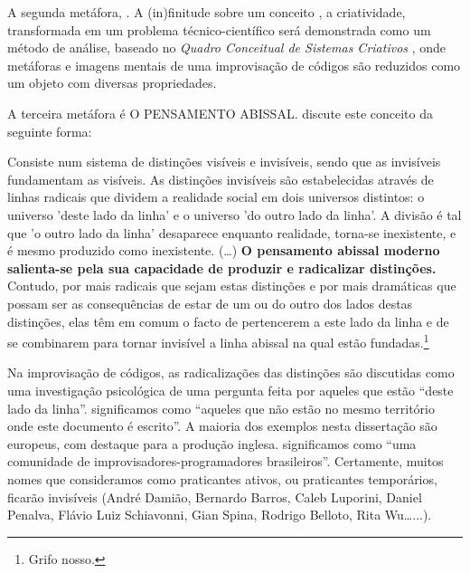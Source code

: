 A segunda metáfora,  \cite[p.~15]{santos_filosofia_2008}. A (in)finitude sobre um conceito , a criatividade, transformada em um problema técnico-científico será demonstrada como um método de análise, baseado no \emph{Quadro Conceitual de Sistemas Criativos} \cite{mclean_music_2006,Forth2010}, onde metáforas e imagens mentais de uma improvisação de códigos são reduzidos como um objeto com diversas propriedades. 

A terceira metáfora é \MakeTextUppercase{o pensamento abissal}.  discute este conceito da seguinte forma:

\begin{citacao}
Consiste num sistema de distinções visíveis e invisíveis, sendo que as invisíveis fundamentam as visíveis. As distinções invisíveis são estabelecidas através de linhas radicais que dividem a realidade social em dois universos distintos: o universo  'deste lado da linha' e o universo 'do outro lado da linha'. A divisão é tal que 'o outro lado da linha' desaparece enquanto realidade, torna-se inexistente, e é mesmo produzido como inexistente. (\ldots) \textbf{O pensamento abissal moderno salienta-se pela sua capacidade de produzir e radicalizar distinções.} Contudo, por mais radicais que sejam estas distinções e por mais dramáticas que possam ser as consequências de estar de um ou do outro dos lados destas distinções, elas têm em comum o facto de pertencerem a este lado da linha e de se combinarem para tornar invisível a linha abissal na qual estão fundadas.\footnote{Grifo nosso.} 
\end{citacao}

Na improvisação de códigos, as radicalizações das distinções são discutidas como uma investigação psicológica de uma pergunta feita por aqueles que estão ``deste lado da linha''.  significamos como ``aqueles que não estão no mesmo território onde este documento é escrito''. A maioria dos exemplos nesta dissertação são europeus, com destaque para a produção inglesa.  significamos como ``uma comunidade de improvisadores-programadores brasileiros''. Certamente, muitos nomes que consideramos como praticantes ativos, ou praticantes temporários, ficarão invisíveis (André Damião, Bernardo Barros, Caleb Luporini, Daniel Penalva, Flávio Luiz Schiavonni, Gian Spina, Rodrigo Belloto, Rita Wu\ldots...).

